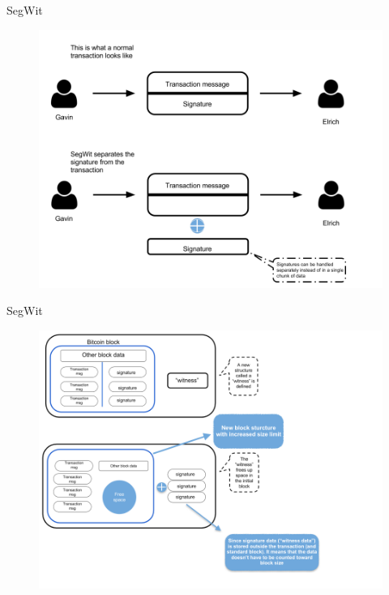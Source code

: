 \documentclass[11pt]{beamer}
\begin{document}
\begin{frame}{SegWit}
	\begin{figure}[]
		\centering
		\includegraphics  [scale=0.3]{Images/segwit1}
	\end{figure}
\end{frame}


\begin{frame}{SegWit}
	\begin{figure}[]
		\centering
		\includegraphics  [scale=0.3]{Images/segwit2}
	\end{figure}
\end{frame}
\end{document}
